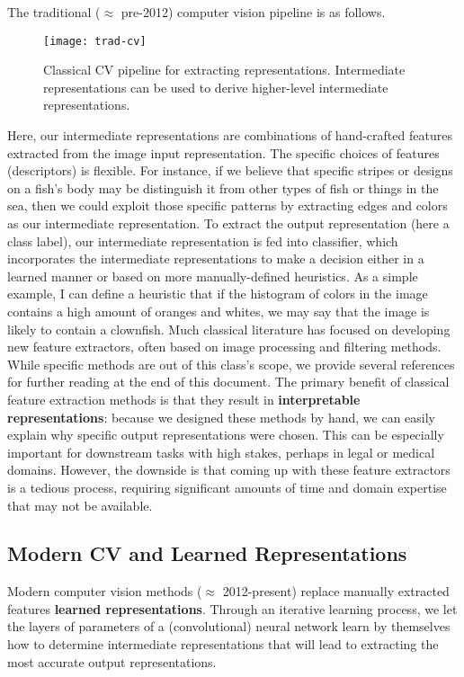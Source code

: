 \documentclass[12pt]{article}
\begin{document}
The traditional ($\approx$ pre-2012) computer vision pipeline is as follows.

\begin{figure}[H]
  \caption{Classical CV pipeline for extracting representations. Intermediate representations can be used to derive higher-level intermediate representations. }
  \centering
\texttt{[image: trad-cv]}
\end{figure}

Here, our intermediate representations are combinations of hand-crafted features extracted from the image input representation. The specific choices of features (descriptors) is flexible. For instance, if we believe that specific stripes or designs on a fish's body may be distinguish it from other types of fish or things in the sea, then we could exploit those specific patterns by extracting edges and colors as our intermediate representation. To extract the output representation (here a class label), our intermediate representation is fed into classifier, which incorporates the intermediate representations to make a decision either in a learned manner or based on more manually-defined heuristics. As a simple example, I can define a heuristic that if the histogram of colors in the image contains a high amount of oranges and whites, we may say that the image is likely to contain a clownfish. Much classical literature has focused on developing new feature extractors, often based on image processing and filtering methods. While specific methods are out of this class's scope, we provide several references for further reading at the end of this document. The primary benefit of classical feature extraction methods is that they result in \textbf{interpretable representations}: because we designed these methods by hand, we can easily explain why specific output representations were chosen. This can be especially important for downstream tasks with high stakes, perhaps in legal or medical domains. However, the downside is that coming up with these feature extractors is a tedious process, requiring significant amounts of time and domain expertise that may not be available.

\subsection*{Modern CV and Learned Representations}
Modern computer vision methods ($\approx$ 2012-present) replace manually extracted features \textbf{learned representations}. Through an iterative learning process, we let the layers of parameters of a (convolutional) neural network learn by themselves how to determine intermediate representations that will lead to extracting the most accurate output representations.
\end{document}
